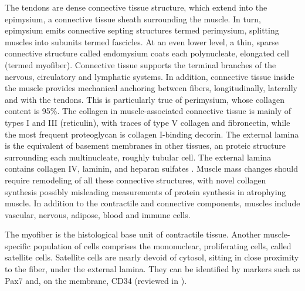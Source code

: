 \documentclass[12pt,english]{report}\usepackage[]{graphicx}\usepackage[]{color}
\begin{document}
The tendons are dense connective tissue structure, which extend into
the epimysium, a connective tissue sheath surrounding the muscle.
In turn, epimysium emits connective septing structures termed perimysium,
splitting muscles into subunits termed fascicles. At an even lower
level, a thin, sparse connective structure called endomysium coats
each polynucleate, elongated cell (termed myofiber). Connective tissue
supports the terminal branches of the nervous, circulatory and lymphatic
systems. In addition, connective tissue inside the muscle provides
mechanical anchoring between fibers, longitudinally, laterally and
with the tendons. This is particularly true of perimysium, whose collagen
content is 95\%\citep{light1984characterization}. The collagen in
muscle-associated connective tissue is mainly of types I and III (reticulin),
with traces of type V collagen and fibronectin, while the most frequent
proteoglycan is collagen I-binding decorin\citep{eggen1994decorin}.
The external lamina is the equivalent of basement membranes in other
tissues, an proteic structure surrounding each multinucleate, roughly
tubular cell. The external lamina contains collagen IV, laminin, and
heparan sulfates \citep{grounds2005strength,mann2011aberrant}. Muscle
mass changes should require remodeling of all these connective structures,
with novel collagen synthesis possibly misleading measurements of
protein synthesis in atrophying muscle. In addition to the contractile
and connective components, muscles include vascular, nervous, adipose,
blood and immune cells.

The myofiber is the histological base unit of contractile tissue.
Another muscle-specific population of cells comprises the mononuclear,
proliferating cells, called satellite cells. Satellite cells are nearly
devoid of cytosol, sitting in close proximity to the fiber, under
the external lamina. They can be identified by markers such as Pax7
and, on the membrane, CD34 (reviewed in \citep{scharner2011muscle}).
\end{document}
